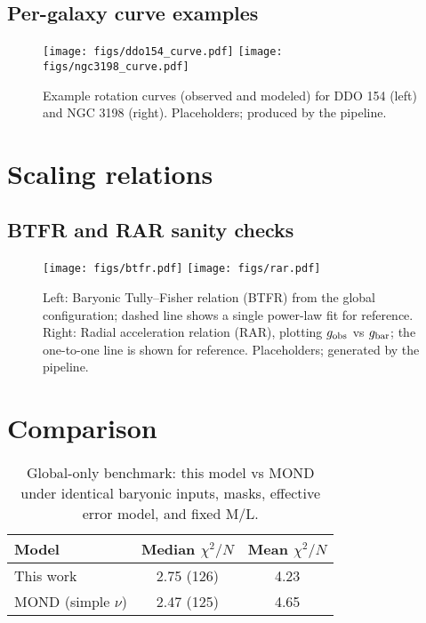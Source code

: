 \documentclass[twocolumn,prd,amsmath,amssymb,aps,superscriptaddress,nofootinbib]{revtex4-2}
\begin{document}
\subsection*{Per-galaxy curve examples}
\begin{figure}[h]
  \centering
  \texttt{[image: figs/ddo154\_curve.pdf]}\hfill
  \texttt{[image: figs/ngc3198\_curve.pdf]}
  \caption{Example rotation curves (observed and modeled) for DDO 154 (left) and NGC 3198 (right). Placeholders; produced by the pipeline.}
  \label{fig:curves_examples}
\end{figure}

\section{Scaling relations}
\subsection*{BTFR and RAR sanity checks}
\begin{figure}[h]
  \centering
  \texttt{[image: figs/btfr.pdf]}\hfill
  \texttt{[image: figs/rar.pdf]}
  \caption{Left: Baryonic Tully–Fisher relation (BTFR) from the global configuration; dashed line shows a single power-law fit for reference. Right: Radial acceleration relation (RAR), plotting $g_{\rm obs}$ vs $g_{\rm bar}$; the one-to-one line is shown for reference. Placeholders; generated by the pipeline.}
  \label{fig:scaling_relations}
\end{figure}

\section{Comparison}
\begin{table}[h]
  \centering
  \caption{Global-only benchmark: this model vs MOND under identical baryonic inputs, masks, effective error model, and fixed M/L.}
  \label{tab:compare_mond}
  \begin{tabular}{lcc}
    \toprule
    Model & Median $\chi^2/N$ & Mean $\chi^2/N$ \\
    \midrule
    This work & 2.75 (126) & 4.23 \\
    MOND (simple $\nu$) & 2.47 (125) & 4.65 \\
    \bottomrule
  \end{tabular}
\end{table}
\end{document}
